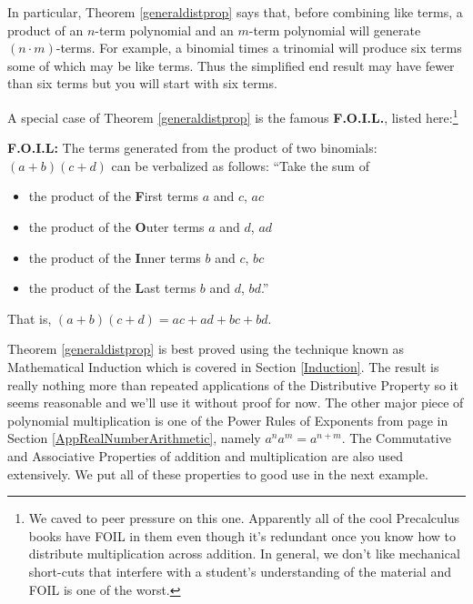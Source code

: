 \documentclass{ximera}
\begin{document}

 

In particular, Theorem \ref{generaldistprop} says that, before combining like terms, a product of an $n$-term polynomial and an $m$-term polynomial will generate $(n \cdot m)$-terms.  For example, a binomial times a trinomial will produce six terms some of which may be like terms.  Thus the simplified end result may have fewer than six terms but you will start with six terms. 

 

A special case of Theorem \ref{generaldistprop}  is the famous \textbf{F.O.I.L.}, listed here:\footnote{We caved to peer pressure on this one.  Apparently all of the cool Precalculus books have FOIL in them even though it's redundant once you know how to distribute multiplication across addition.  In general, we don't like mechanical short-cuts that interfere with a student's understanding of the material and FOIL is one of the worst.}

 


\begin{theorem}\label{FOIL} \textbf{F.O.I.L:} The terms generated from the product of two binomials: $(a + b)(c+d)$ can be verbalized as follows: ``Take the sum of

\begin{itemize}

\item the product of the \textbf{F}irst terms $a$ and $c$, $ac$

\item the product of the \textbf{O}uter terms $a$ and $d$, $ad$

\item  the product of the \textbf{I}nner terms $b$ and $c$, $bc$

\item  the product of the \textbf{L}ast terms $b$ and $d$, $bd$.''

\end{itemize}

That is, $(a+b)(c+d) = ac + ad + bc + bd$.

\end{theorem}


 

Theorem \ref{generaldistprop} is best proved using the technique known as Mathematical Induction which is covered in Section \ref{Induction}.  The result is really nothing more than repeated applications of the Distributive Property so it seems reasonable and we'll use it without proof for now.  The other major piece of polynomial multiplication is one of the Power Rules of Exponents from page \pageref{propertiesofintegerexponents} in Section \ref{AppRealNumberArithmetic}, namely  $a^n a^m = a^{n+m}$.  The Commutative and Associative Properties of addition and multiplication are also used extensively.  We put all of these properties to good use in the next example.
\end{document}
